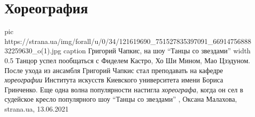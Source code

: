  
 
 
 
 
\chapter{Хореография}
\label{sec:slova.horeografia}

\ifcmt
  pic https://strana.ua/img/forall/u/0/34/121619690_751527835397091_6691475688832259630_o(1).jpg
	caption Григорий Чапкис, на шоу \enquote{Танцы со звездами}
	width 0.5
\fi
Танцор успел пообщаться с Фиделем Кастро, Хо Ши Мином, Мао Цзэдуном.  После
ухода из ансамбля Григорий Чапкис стал преподавать на кафедре
\emph{хореографии} Института искусств Киевского университета имени Бориса
Гринченко.  Еще одна волна популярности настигла \emph{хореографа}, когда он
сел в судейское кресло популярного шоу \enquote{Танцы со звездами}
, 
Оксана Малахова, strana.ua, 13.06.2021

